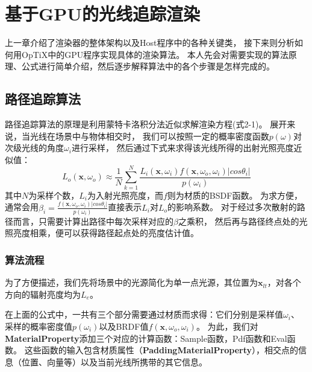 \chapter{基于GPU的光线追踪渲染}
\label{cha:algorithms}

上一章介绍了渲染器的整体架构以及Host程序中的各种关键类，
接下来则分析如何用OpTiX中的GPU程序实现具体的渲染算法。
本人先会对需要实现的算法原理、公式进行简单介绍，然后逐步解释算法中的各个步骤是怎样完成的。

\section{路径追踪算法}
路径追踪算法的原理是利用蒙特卡洛积分法近似求解渲染方程(式2-1)。
展开来说，当光线在场景中与物体相交时，
我们可以按照一定的概率密度函数$p(\omega)$对次级光线的角度$\omega_i$进行采样，
然后通过下式来求得该光线所得的出射光照亮度近似值：
\begin{equation}
L_o(\textbf{x}, \omega_o) 
\approx \frac{1}{N}\sum_{k=1}^{N}\frac{L_i(\textbf{x}, \omega_i)f(\textbf{x}, \omega_o, \omega_i)|cos\theta_i|}{p(\omega_i)}
\end{equation}
其中$N$为采样个数，$L_i$为入射光照亮度，而$f$则为材质的BSDF函数。
为求方便，通常会用$\beta_i=\frac{f(\textbf{x}, \omega_o, \omega_i)|cos\theta_i|}{p(\omega_i)}$直接表示$L_i$对$L_o$的影响系数。
对于经过多次散射的路径而言，只需要计算出路径中每次采样对应的$\beta$之乘积，
然后再与路径终点处的光照亮度相乘，便可以获得路径起点处的亮度估计值。

\subsection{算法流程}
\label{cha:pathtrace}

为了方便描述，我们先将场景中的光源简化为单一点光源，其位置为$\textbf{x}_{lt}$，对各个方向的辐射亮度均为$L_e$。

在上面的公式中，一共有三个部分需要通过材质而求得：它们分别是采样值$\omega_i$、
采样的概率密度值$p(\omega_i)$以及BRDF值$f(\textbf{x}, \omega_o, \omega_i)$。
为此，我们对\textbf{MaterialProperty}添加三个对应的计算函数：Sample函数，Pdf函数和Eval函数。
这些函数的输入包含材质属性（\textbf{PaddingMaterialProperty}），相交点的信息（位置、向量等）以及当前光线所携带的其它信息。

